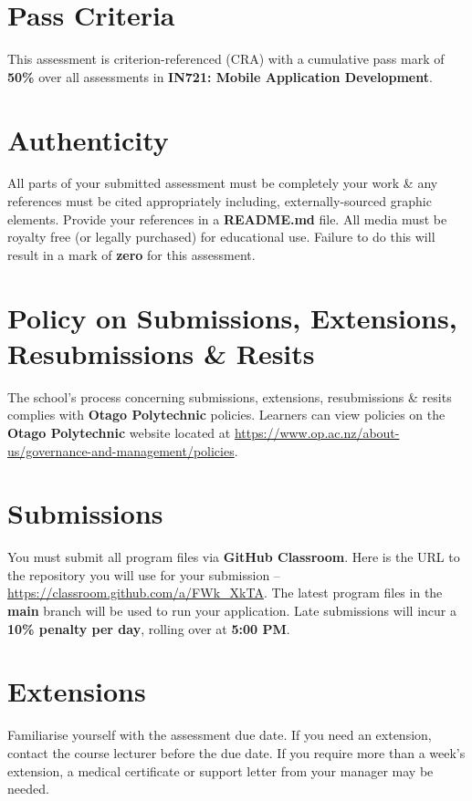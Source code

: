 \documentclass{article}
\begin{document}
\section*{Pass Criteria}
This assessment is criterion-referenced (CRA) with a cumulative pass mark of \textbf{50\%} over all assessments in \textbf{IN721: Mobile Application Development}.

\section*{Authenticity}
All parts of your submitted assessment must be completely your work \& any references must be cited appropriately including, externally-sourced graphic elements. Provide your references in a \textbf{README.md} file. All media must be royalty free (or legally purchased) for educational use. Failure to do this will result in a mark of \textbf{zero} for this assessment.

\section*{Policy on Submissions, Extensions, Resubmissions \& Resits}
The school's process concerning submissions, extensions, resubmissions \& resits complies with \textbf{Otago Polytechnic} policies. Learners can view policies on the \textbf{Otago Polytechnic} website located at \href{https://www.op.ac.nz/about-us/governance-and-management/policies}{https://www.op.ac.nz/about-us/governance-and-management/policies}.

\section*{Submissions}
You must submit all program files via \textbf{GitHub Classroom}. Here is the URL to the repository you will use for your submission – \href{https://classroom.github.com/a/FWk\_XkTA}{https://classroom.github.com/a/FWk\_XkTA}. The latest program files in the \textbf{main} branch will be used to run your application. Late submissions will incur a \textbf{10\% penalty per day}, rolling over at \textbf{5:00 PM}.

\section*{Extensions}
Familiarise yourself with the assessment due date. If you need an extension, contact the course lecturer before the due date. If you require more than a week's extension, a medical certificate or support letter from your manager may be needed.
\end{document}
